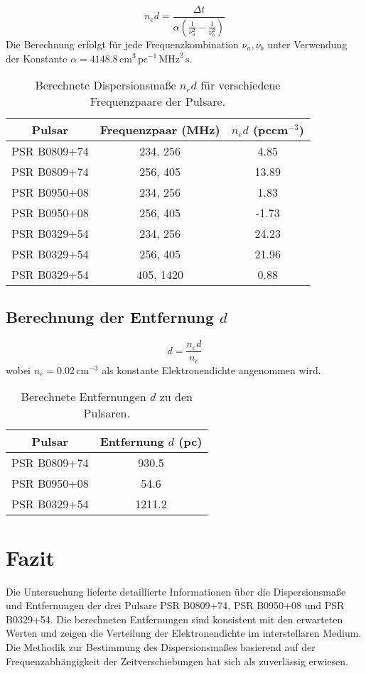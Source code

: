 \documentclass[a4paper,12pt]{article}
\begin{document}
\[
n_e d = \frac{\Delta t}{\alpha \left( \frac{1}{\nu_a^2} - \frac{1}{\nu_b^2} \right)}
\]
Die Berechnung erfolgt für jede Frequenzkombination \(\nu_a, \nu_b\) unter Verwendung der Konstante \(\alpha = 4148.8 \, \text{cm}^3 \, \text{pc}^{-1} \, \text{MHz}^2 \, \text{s}\).

\begin{table}[H]
\centering
\begin{tabular}{|c|c|c|}
\hline
Pulsar         & Frequenzpaar (MHz) & \(n_e d\) (pccm\(^{-3}\)) \\ \hline
PSR B0809+74   & 234, 256           & 4.85                      \\ \hline
PSR B0809+74   & 256, 405           & 13.89                     \\ \hline
PSR B0950+08   & 234, 256           & 1.83                      \\ \hline
PSR B0950+08   & 256, 405           & -1.73                     \\ \hline
PSR B0329+54   & 234, 256           & 24.23                     \\ \hline
PSR B0329+54   & 256, 405           & 21.96                     \\ \hline
PSR B0329+54   & 405, 1420          & 0.88                      \\ \hline
\end{tabular}
\caption{Berechnete Dispersionsmaße \(n_e d\) für verschiedene Frequenzpaare der Pulsare.}
\end{table}

\subsection*{Berechnung der Entfernung \(d\)}

\[
d = \frac{n_e d}{n_e}
\]
wobei \(n_e = 0.02 \, \text{cm}^{-3}\) als konstante Elektronendichte angenommen wird.

\begin{table}[H]
\centering
\begin{tabular}{|c|c|}
\hline
Pulsar         & Entfernung \(d\) (pc) \\ \hline
PSR B0809+74   & 930.5                 \\ \hline
PSR B0950+08   & 54.6                  \\ \hline
PSR B0329+54   & 1211.2                \\ \hline
\end{tabular}
\caption{Berechnete Entfernungen \(d\) zu den Pulsaren.}
\end{table}

\section*{Fazit}
Die Untersuchung lieferte detaillierte Informationen über die Dispersionsmaße und Entfernungen der drei Pulsare PSR B0809+74, PSR B0950+08 und PSR B0329+54. Die berechneten Entfernungen sind konsistent mit den erwarteten Werten und zeigen die Verteilung der Elektronendichte im interstellaren Medium. Die Methodik zur Bestimmung des Dispersionsmaßes basierend auf der Frequenzabhängigkeit der Zeitverschiebungen hat sich als zuverlässig erwiesen.
\end{document}
